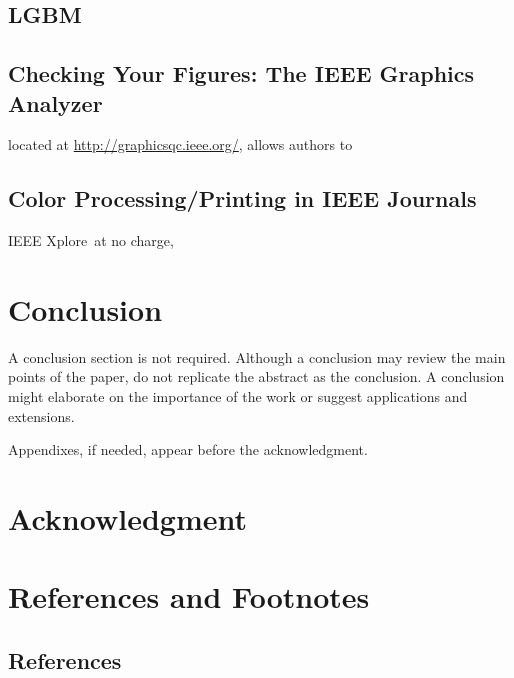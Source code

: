 \documentclass[journal,twoside,web]{ieeecolor}
\begin{document}
\subsection{LGBM}









\subsection{Checking Your Figures: The IEEE Graphics Analyzer}
located at
\underline{http://graphicsqc.ieee.org/}, allows authors to 




\subsection{Color Processing/Printing in IEEE Journals}
IEEE Xplore\textregistered\ at no charge, 

\section{Conclusion}
A conclusion section is not required. Although a conclusion may review the 
main points of the paper, do not replicate the abstract as the conclusion. A 
conclusion might elaborate on the importance of the work or suggest 
applications and extensions. 

\appendices

Appendixes, if needed, appear before the acknowledgment.

\section*{Acknowledgment}



\section*{References and Footnotes}

\subsection{References}
\end{document}
